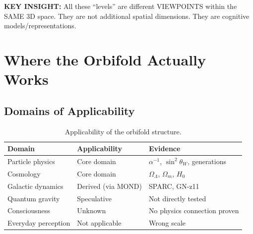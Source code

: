 \documentclass[12pt,a4paper]{article}
\begin{document}
\begin{center}
\end{center}

\textbf{KEY INSIGHT:} All these ``levels'' are different VIEWPOINTS within the SAME 3D space. They are not additional spatial dimensions. They are cognitive models/representations.

\section{Where the Orbifold Actually Works}

\subsection{Domains of Applicability}

\begin{table}[h]
\centering
\begin{tabular}{@{}lll@{}}
\toprule
Domain & Applicability & Evidence \\
\midrule
Particle physics & Core domain & $\alpha^{-1}$, $\sin^2\theta_W$, generations \\
Cosmology & Core domain & $\Omega_\Lambda$, $\Omega_m$, $H_0$ \\
Galactic dynamics & Derived (via MOND) & SPARC, GN-z11 \\
Quantum gravity & Speculative & Not directly tested \\
Consciousness & Unknown & No physics connection proven \\
Everyday perception & Not applicable & Wrong scale \\
\bottomrule
\end{tabular}
\caption{Applicability of the orbifold structure.}
\end{table}
\end{document}
